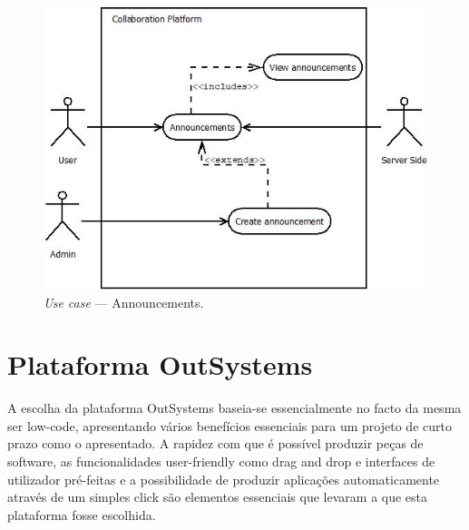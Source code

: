 \begin{figure}[H]
    \centering
    \includegraphics[scale=0.6]{figures/Announcements use case.jpeg}
    \caption{\textit{Use case} --- Announcements.}\label{fig:uc:announcements}
\end{figure}

\section{Plataforma OutSystems}\label{sec:plataformaOutSystems}

A escolha da plataforma OutSystems baseia-se essencialmente no facto da mesma ser low-code,
apresentando vários benefícios essenciais para um projeto de curto prazo como o apresentado. A rapidez
com que é possível produzir peças de software, as funcionalidades user-friendly como drag and drop e 
interfaces de utilizador pré-feitas e a possibilidade de produzir aplicações automaticamente através de
um simples click são elementos essenciais que levaram a que esta plataforma fosse escolhida.